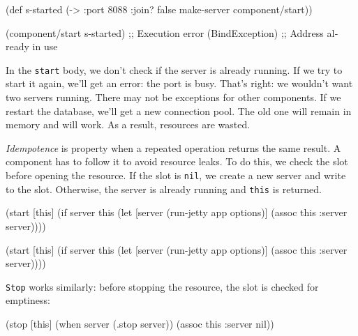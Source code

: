 \else

\begin{english}
  \begin{clojure}
(def s-started (-> {:port 8088 :join? false}
                    make-server
                    component/start))

(component/start s-started)
;; Execution error (BindException)
;; Address already in use
  \end{clojure}
\end{english}

\fi

In the \verb|start| body, we don't check if the server is already running. If we try to start it again, we'll get an error: the port is busy. That's right: we wouldn't want two servers running. There may not be exceptions for other components. If we restart the database, we'll get a new connection pool. The old one will remain in memory and will work. As a result, resources are wasted.


\emph{Idempotence} is property when a repeated operation returns the same result. A component has to follow it to avoid resource leaks. To do this, we check the slot before opening the resource. If the slot is \verb|nil|, we create a new server and write to the slot. Otherwise, the server is already running and \verb|this| is returned.

\ifnarrow

\begin{english}
  \begin{clojure}
(start [this]
  (if server
    this
    (let [server (run-jetty
                   app options)]
      (assoc this :server server))))
  \end{clojure}
\end{english}

\else

\begin{english}
  \begin{clojure}
(start [this]
  (if server
    this
    (let [server (run-jetty app options)]
      (assoc this :server server))))
  \end{clojure}
\end{english}

\fi

\noindent
\verb|Stop| works similarly: before stopping the resource, the slot is checked for emptiness:

\begin{english}
  \begin{clojure}
(stop [this]
  (when server
    (.stop server))
  (assoc this :server nil))
  \end{clojure}
\end{english}

